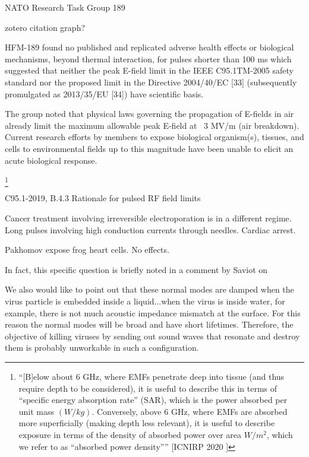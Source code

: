 \documentclass[paper.tex]{subfiles}
\begin{document}
NATO Research Task Group 189 \cite{treatyelectromagnetic}

zotero citation graph?

HFM-189 found no published and replicated adverse health effects or biological mechanisms, beyond
thermal interaction, for pulses shorter than 100 ms which suggested that neither the peak E-field limit in the
IEEE C95.1TM-2005 safety standard nor the proposed limit in the Directive 2004/40/EC [33] (subsequently
promulgated as 2013/35/EU [34]) have scientific basis. 

The group noted that physical laws governing the propagation of E-fields in air already limit the maximum allowable peak E-field at ~3 MV/m (air breakdown). Current research efforts by members to expose biological organism(s), tissues, and cells to environmental
fields up to this magnitude have been unable to elicit an acute biological response.


\footnote{``{[B]elow about 6 GHz, where EMFs penetrate deep into tissue (and thus require depth to be considered), it is useful to describe this in terms of “specific energy absorption rate” (SAR), which is the power absorbed per unit mass $(W/kg)$. Conversely, above 6 GHz, where EMFs are absorbed more superficially (making depth less relevant), it is useful to describe exposure in terms of the density of absorbed power over area $W/m^2$, which we refer to as “absorbed power density”}'' [ICNIRP 2020 \faExternalLink] }


C95.1-2019, B.4.3 Rationale for pulsed RF field limits



Cancer treatment involving irreversible electroporation is in a different regime. Long pulses involving high conduction currents through needles. Cardiac arrest.



Pakhomov \cite{Comparative} expose frog heart cells. No effects.



In fact, this specific question is briefly noted in a comment by Saviot \cite{Comment2004} on 

We also would like to point out that these normal modes
are damped when the virus particle is embedded inside a
liquid...when the virus is inside water, for example, there is not much acoustic impedance mismatch at the surface. For this reason the normal modes will be broad and have short lifetimes. Therefore, the objective of killing viruses by sending out sound waves that resonate and destroy them is probably unworkable in such a configuration.
\end{document}
